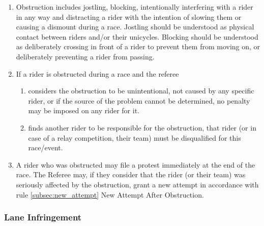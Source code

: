 \begin{enumerate}[leftmargin=1.5em,labelsep=*]
	\item Obstruction includes jostling, blocking, intentionally interfering with a rider in any way and 
    distracting a rider with the intention of slowing them or causing a dismount during a race.
	  Jostling should be understood as physical contact between riders and/or their unicycles.
	  Blocking should be understood as deliberately crossing in front of a rider to prevent them from moving on, 
    or deliberately preventing a rider from passing.
	
	\item If a rider is obstructed during a race and the referee
	
	\begin{enumerate}[label*=\arabic*,leftmargin=1.5em,labelsep=*]
		\item considers the obstruction to be unintentional, not caused by any specific rider, 
      or if the source of the problem cannot be determined, no penalty may be imposed on any rider for it.
		
		\item finds another rider to be responsible for the obstruction, that rider 
      (or in case of a relay competition, their team) must be disqualified for this race/event.
	\end{enumerate}
	
	\item A rider who was obstructed may file a protest immediately at the end of the race.
	The Referee may, if they consider that the rider (or their team) was seriously affected by the obstruction, 
  grant a new attempt in accordance with rule \ref{subsec:new_attempt} New Attempt After Obstruction.
\end{enumerate}

\subsubsection{Lane Infringement}

